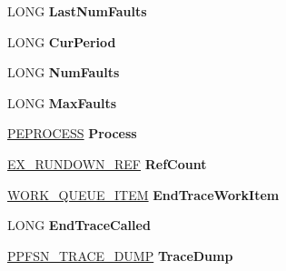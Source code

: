 \begin{DoxyCompactItemize}
\mbox{\label{struct___p_f_s_n___t_r_a_c_e___h_e_a_d_e_r_a5b5084251ab2541fb765f23b0fd2c9ec}} 
L\+O\+NG {\bfseries Last\+Num\+Faults}
\item 
\mbox{\label{struct___p_f_s_n___t_r_a_c_e___h_e_a_d_e_r_ab076c1b1c47f24e231135760ef9dd600}} 
L\+O\+NG {\bfseries Cur\+Period}
\item 
\mbox{\label{struct___p_f_s_n___t_r_a_c_e___h_e_a_d_e_r_a9655d495c721ce5d3ecedfb49e0fafca}} 
L\+O\+NG {\bfseries Num\+Faults}
\item 
\mbox{\label{struct___p_f_s_n___t_r_a_c_e___h_e_a_d_e_r_af4781f91daf01f5e2d447df0ea8bd2b5}} 
L\+O\+NG {\bfseries Max\+Faults}
\item 
\mbox{\label{struct___p_f_s_n___t_r_a_c_e___h_e_a_d_e_r_a2ba4055523907de29d1780130c551f6f}} 
\hyperlink{struct___e_p_r_o_c_e_s_s}{P\+E\+P\+R\+O\+C\+E\+SS} {\bfseries Process}
\item 
\mbox{\label{struct___p_f_s_n___t_r_a_c_e___h_e_a_d_e_r_a78a4940617ff9bed07d9ea088c7ae82b}} 
\hyperlink{struct___e_x___r_u_n_d_o_w_n___r_e_f}{E\+X\+\_\+\+R\+U\+N\+D\+O\+W\+N\+\_\+\+R\+EF} {\bfseries Ref\+Count}
\item 
\mbox{\label{struct___p_f_s_n___t_r_a_c_e___h_e_a_d_e_r_a9e220325756ba6a84f7f7152302b23c9}} 
\hyperlink{struct___w_o_r_k___q_u_e_u_e___i_t_e_m}{W\+O\+R\+K\+\_\+\+Q\+U\+E\+U\+E\+\_\+\+I\+T\+EM} {\bfseries End\+Trace\+Work\+Item}
\item 
\mbox{\label{struct___p_f_s_n___t_r_a_c_e___h_e_a_d_e_r_aab07c18ccc9f5d7ab8d1057907b9933a}} 
L\+O\+NG {\bfseries End\+Trace\+Called}
\item 
\mbox{\label{struct___p_f_s_n___t_r_a_c_e___h_e_a_d_e_r_ac681aaa420aee549483a3a13f2418f5d}} 
\hyperlink{struct___p_f_s_n___t_r_a_c_e___d_u_m_p}{P\+P\+F\+S\+N\+\_\+\+T\+R\+A\+C\+E\+\_\+\+D\+U\+MP} {\bfseries Trace\+Dump}

\end{DoxyCompactItemize}
